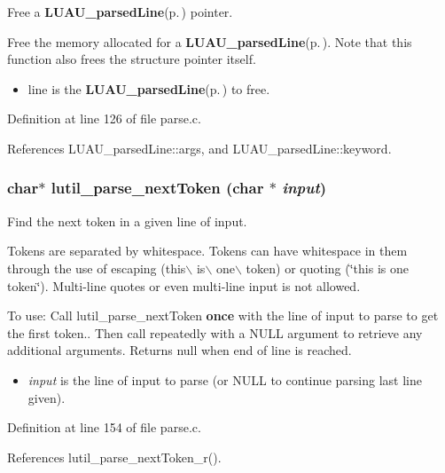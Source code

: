 Free a {\bf LUAU\_\-parsed\-Line}{\rm (p.\,\pageref{structLUAU__parsedLine})} pointer. 

Free the memory allocated for a {\bf LUAU\_\-parsed\-Line}{\rm (p.\,\pageref{structLUAU__parsedLine})}. Note that this function also frees the structure pointer itself.

\begin{itemize}
\item line is the {\bf LUAU\_\-parsed\-Line}{\rm (p.\,\pageref{structLUAU__parsedLine})} to free. \end{itemize}


Definition at line 126 of file parse.c.

References LUAU\_\-parsed\-Line::args, and LUAU\_\-parsed\-Line::keyword.
\subsubsection{\setlength{\rightskip}{0pt plus 5cm}char$\ast$ lutil\_\-parse\_\-next\-Token (char $\ast$ {\em input})}\label{parse_8h_a4}


Find the next token in a given line of input. 

Tokens are separated by whitespace. Tokens can have whitespace in them through the use of escaping (this$\backslash$ is$\backslash$ one$\backslash$ token) or quoting (\char`\"{}this is one token\char`\"{}). Multi-line quotes or even multi-line input is not allowed.

To use: Call lutil\_\-parse\_\-next\-Token {\bf once} with the line of input to parse to get the first token.. Then call repeatedly with a NULL argument to retrieve any additional arguments. Returns null when end of line is reached.

\begin{itemize}
\item {\em input\/} is the line of input to parse (or NULL to continue parsing last line given). 
\end{itemize}


Definition at line 154 of file parse.c.

References lutil\_\-parse\_\-next\-Token\_\-r().
